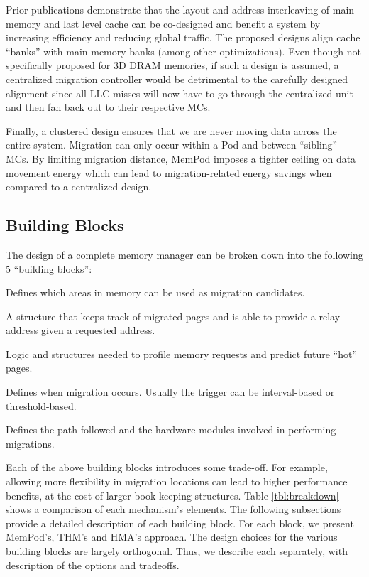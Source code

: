 Prior publications \cite{loh-isca08} demonstrate that the layout and address interleaving of main memory and last level cache can be co-designed and benefit a system by increasing efficiency and reducing global traffic. The proposed designs align cache ``banks'' with main memory banks (among other optimizations). Even though not specifically proposed for 3D DRAM memories, if such a design is assumed, a centralized migration controller would be detrimental to the carefully designed alignment since all LLC misses will now have to go through the centralized unit and then fan back out to their respective MCs.

Finally, a clustered design ensures that we are never moving data across the entire system. Migration can only occur within a Pod and between ``sibling'' MCs. By limiting migration distance, MemPod imposes a tighter ceiling on data movement energy which can lead to migration-related energy savings when compared to a centralized design.


\subsection{Building Blocks}

The design of a complete memory manager can be broken down into the following 5 ``building blocks'':
\begin{description}[style=unboxed,leftmargin=0cm]
\setlength\itemsep{0em}
\item [Migration flexibility:] Defines which areas in memory can be used as migration candidates. 
\item [Remap table:] A structure that keeps track of migrated pages and is able to provide a relay address given a requested address.
\item [Activity tracking:] Logic and structures needed to profile memory requests and predict future ``hot'' pages.
\item [Migration trigger:] Defines when migration occurs. Usually the trigger can be interval-based or threshold-based.
\item [Migration driver/datapath:] Defines the path followed and the hardware modules involved in performing migrations.
\end{description}

Each of the above building blocks introduces some trade-off. For example, allowing more flexibility in migration locations can lead to higher performance benefits, at the cost of larger book-keeping structures. Table \ref{tbl:breakdown} shows a comparison of each mechanism's elements. The following subsections provide a detailed description of each building block. For each block, we present MemPod's, THM's and HMA's approach.
The design choices for the various building blocks are largely
orthogonal.  Thus, we describe each separately, with description of the options
and tradeoffs.

